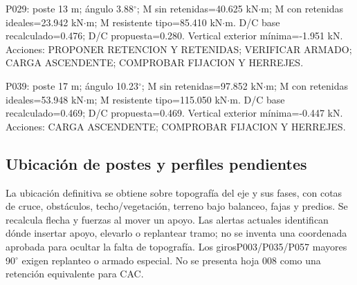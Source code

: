 P029: poste 13 m; ángulo 3.88\ensuremath{^\circ}; M sin retenidas=40.625 kN\ensuremath{\cdot}m; M con retenidas ideales=23.942 kN\ensuremath{\cdot}m; M resistente tipo=85.410 kN\ensuremath{\cdot}m. D/C base recalculado=0.476; D/C propuesta=0.280. Vertical exterior mínima=-1.951 kN. Acciones: PROPONER RETENCION Y RETENIDAS; VERIFICAR ARMADO; CARGA ASCENDENTE; COMPROBAR FIJACION Y HERREJES.

P039: poste 17 m; ángulo 10.23\ensuremath{^\circ}; M sin retenidas=97.852 kN\ensuremath{\cdot}m; M con retenidas ideales=53.948 kN\ensuremath{\cdot}m; M resistente tipo=115.050 kN\ensuremath{\cdot}m. D/C base recalculado=0.469; D/C propuesta=0.469. Vertical exterior mínima=-0.447 kN. Acciones: CARGA ASCENDENTE; COMPROBAR FIJACION Y HERREJES.

\setcounter{subsection}{7}
\subsection{Ubicación de postes y perfiles pendientes}
La ubicación definitiva se obtiene sobre topografía del eje y sus fases, con cotas de cruce, obstáculos, techo/vegetación, terreno bajo balanceo, fajas y predios. Se recalcula flecha y fuerzas al mover un apoyo. Las alertas actuales identifican dónde insertar apoyo, elevarlo o replantear tramo; no se inventa una coordenada aprobada para ocultar la falta de topografía. Los girosP003/P035/P057 mayores 90\ensuremath{^\circ} exigen replanteo o armado especial. No se presenta hoja 008 como una retención equivalente para CAC.


